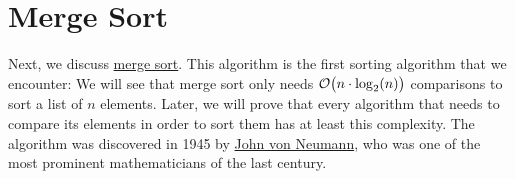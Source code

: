 
\section{Merge Sort}
Next, we discuss \href{https://en.wikipedia.org/wiki/Merge_sort}{merge sort}.  This algorithm
is the first  sorting algorithm that we encounter: We will see that merge sort 
only needs $\mathcal{O}\bigl(n \cdot \log_2(n)\bigr)$ comparisons to sort a list of $n$ elements.  Later, we will prove
that every algorithm that needs to compare its elements in order to sort them has at least this complexity.  
The  algorithm was discovered in 1945 by
\href{http://en.wikipedia.org/wiki/John_von_Neumann}{John von Neumann}, who
was one of the most prominent mathematicians of the last century.

